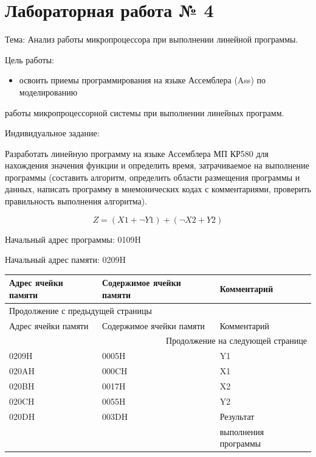 \documentclass[14pt]{extarticle}
\begin{document}
\tableofcontents \clearpage

\section{Лабораторная работа № 4}
\label{sec:org27c83b4}

Тема: Анализ работы микропроцессора при выполнении линейной программы.

Цель работы:
\begin{itemize}
\item освоить приемы программирования на языке Ассемблера (Ass) по моделированию
\end{itemize}
работы микропроцессорной системы при выполнении линейных программ.

Индивидуальное задание:


Разработать линейную программу на языке Ассемблера МП КР580 для нахождения
значения функции и определить время, затрачиваемое на выполнение программы
(составить алгоритм, определить области размещения программы и данных,
написать программу в мнемонических кодах с комментариями, проверить правильность выполнения алгоритма).


$$ Z = (X1 + \neg Y1) + (\neg X2 + Y2) $$

Начальный адрес программы: 0109H

Начальный адрес памяти: 0209H


\begin{longtable}{|l|l|l|}
\hline
Адрес ячейки памяти & Содержимое ячейки памяти & Комментарий\\[0pt]
\hline
\endfirsthead
\multicolumn{3}{l}{Продолжение с предыдущей страницы} \\[0pt]
\hline

Адрес ячейки памяти & Содержимое ячейки памяти & Комментарий \\[0pt]

\hline
\endhead
\hline\multicolumn{3}{r}{Продолжение на следующей странице} \\
\endfoot
\endlastfoot
\hline
0209H & 0005H & Y1\\[0pt]
\hline
020AH & 000CH & X1\\[0pt]
\hline
020BH & 0017H & X2\\[0pt]
\hline
020CH & 0055H & Y2\\[0pt]
\hline
020DH & 003DH & Результат\\[0pt]
 &  & выполнения программы\\[0pt]
\hline
\end{longtable}
\end{document}
